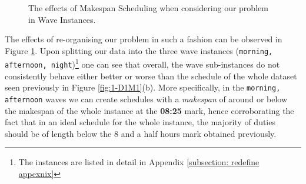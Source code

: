\begin{figure}
\endminipage\hfill
{}%
 
\endminipage

\caption{The effects of Makespan Scheduling when considering our problem in Wave Instances.}
\label{fig: Wave Makespan Scheduling}
\end{figure}

\vspace{\baselineskip}
\noindent
The effects of re-organising our problem in such a fashion can be observed in Figure \ref{fig: Wave Makespan Scheduling}. Upon splitting our data into the three wave instances (\texttt{morning, afternoon, night})\footnote{The instances are listed in detail in Appendix \ref{subsection: redefine appexnix}} one can see that overall, the wave sub-instances do not consistently behave either better or worse than the schedule of the whole dataset seen previously in Figure \ref{fig:1-D1M1}(b). More specifically, in the \texttt{morning, afternoon} waves we can create schedules with a \textit{makespan} of around or below the makespan of the whole instance at the \textbf{08:25} mark, hence corroborating the fact that in an ideal schedule for the whole instance, the majority of duties should be of length below the 8 and a half hours mark obtained previously.

